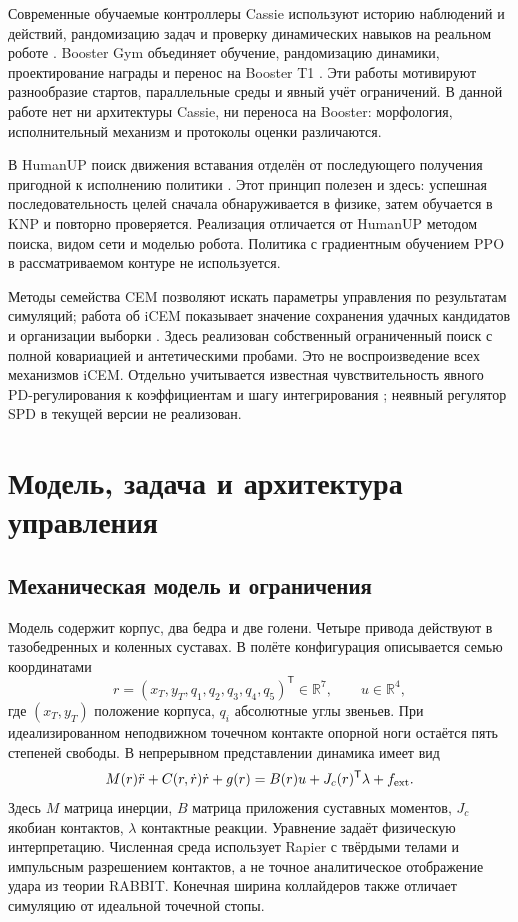 \documentclass[11pt,a4paper]{article}
\newcommand{\R}{\mathbb{R}}
\begin{document}
Современные обучаемые контроллеры Cassie используют историю наблюдений и действий, рандомизацию задач и проверку динамических навыков на реальном роботе \cite{cassie}. Booster Gym объединяет обучение, рандомизацию динамики, проектирование награды и перенос на Booster T1 \cite{booster}. Эти работы мотивируют разнообразие стартов, параллельные среды и явный учёт ограничений. В данной работе нет ни архитектуры Cassie, ни переноса на Booster: морфология, исполнительный механизм и протоколы оценки различаются.

В HumanUP поиск движения вставания отделён от последующего получения пригодной к исполнению политики \cite{humanup}. Этот принцип полезен и здесь: успешная последовательность целей сначала обнаруживается в физике, затем обучается в KNP и повторно проверяется. Реализация отличается от HumanUP методом поиска, видом сети и моделью робота. Политика с градиентным обучением PPO в рассматриваемом контуре не используется.

Методы семейства CEM позволяют искать параметры управления по результатам симуляций; работа об iCEM показывает значение сохранения удачных кандидатов и организации выборки \cite{icem}. Здесь реализован собственный ограниченный поиск с полной ковариацией и антетическими пробами. Это не воспроизведение всех механизмов iCEM. Отдельно учитывается известная чувствительность явного PD-регулирования к коэффициентам и шагу интегрирования \cite{spd}; неявный регулятор SPD в текущей версии не реализован.

\section{Модель, задача и архитектура управления}
\subsection{Механическая модель и ограничения}
Модель содержит корпус, два бедра и две голени. Четыре привода действуют в тазобедренных и коленных суставах. В полёте конфигурация описывается семью координатами
\begin{equation}
 r=(x_T,y_T,q_1,q_2,q_3,q_4,q_5)^\mathsf{T}\in\R^7,
 \qquad u\in\R^4,
 \label{eq:state}
\end{equation}
где $(x_T,y_T)$ \textemdash{} положение корпуса, $q_i$ \textemdash{} абсолютные углы звеньев. При идеализированном неподвижном точечном контакте опорной ноги остаётся пять степеней свободы. В непрерывном представлении динамика имеет вид
\begin{equation}
 M(r)\ddot r+C(r,\dot r)\dot r+g(r)
 =B(r)u+J_c(r)^\mathsf{T}\lambda+f_{\rm ext}.
 \label{eq:dynamics}
\end{equation}
Здесь $M$ \textemdash{} матрица инерции, $B$ \textemdash{} матрица приложения суставных моментов, $J_c$ \textemdash{} якобиан контактов, $\lambda$ \textemdash{} контактные реакции. Уравнение задаёт физическую интерпретацию. Численная среда использует Rapier с твёрдыми телами и импульсным разрешением контактов, а не точное аналитическое отображение удара из теории RABBIT. Конечная ширина коллайдеров также отличает симуляцию от идеальной точечной стопы.
\end{document}
